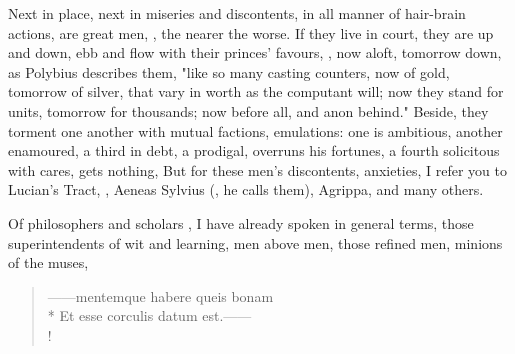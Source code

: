 
Next in place, next in miseries and discontents, in all manner of hair-brain
actions, are great men, , the nearer the
worse. If they live in court, they are up and down, ebb and flow with their
princes' favours, , now aloft, tomorrow
down, as Polybius describes them, "like so many casting
counters, now of gold, tomorrow of silver, that vary in worth as the computant
will; now they stand for units, tomorrow for thousands; now before all, and
anon behind." Beside, they torment one another with mutual factions,
emulations: one is ambitious, another enamoured, a third in debt, a prodigal,
overruns his fortunes, a fourth solicitous with cares, gets nothing, \etc{} But
for these men's discontents, anxieties, I refer you to Lucian's Tract, , Aeneas Sylvius (, he calls them), Agrippa, and many others.

Of philosophers and scholars , I have already
spoken in general terms, those superintendents of wit and learning, men above
men, those refined men, minions of the muses,

\begin{latin}
\begin{verse}%
------mentemque habere queis bonam\\*
Et esse corculis datum est.------\\!
\end{verse}%
\end{latin}

